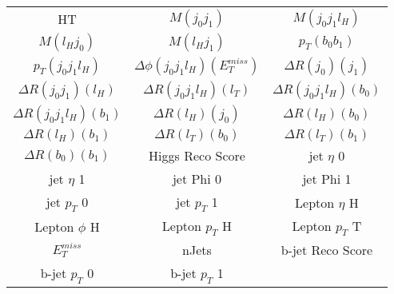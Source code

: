   \begin{center}
  \begin{tabular}{ccc}
    \hline\hline
    HT & $M(j_0j_1)$ & $M(j_0j_1l_{H})$ \\
    $M(l_{H}j_0)$ & $M(l_{H}j_1)$ & $p_T(b_0b_1)$ \\
     $p_T(j_0j_1l_{H})$ & $\Delta\phi(j_0j_1l_{H})(E_T^{miss})$ & $\Delta R(j_0)(j_1)$ \\
    $\Delta R(j_0j_1)(l_{H})$ & $\Delta R(j_0j_1l_{H})(l_{T})$ & $\Delta R(j_0j_1l_{H})(b_0)$ \\
    $\Delta R(j_0j_1l_{H})(b_1)$ & $\Delta R(l_{H})(j_0)$ & $\Delta R(l_{H})(b_0)$ \\
    $\Delta R(l_{H})(b_1)$ & $\Delta R(l_{T})(b_0)$ & $\Delta R(l_{T})(b_1)$ \\
    $\Delta R(b_0)(b_1)$ & Higgs Reco Score & jet  $\eta$ 0 \\
    jet  $\eta$ 1 & jet Phi 0 & jet Phi 1 \\
    jet  $p_T$ 0 & jet  $p_T$ 1 & Lepton  $\eta$ H \\
    Lepton $\phi$ H & Lepton  $p_T$ H & Lepton  $p_T$ T \\
    $E_T^{miss}$ & nJets & b-jet Reco Score \\
    b-jet $p_T$ 0 & b-jet $p_T$ 1 & \\
    \hline
  \end{tabular}
  \end{center}

